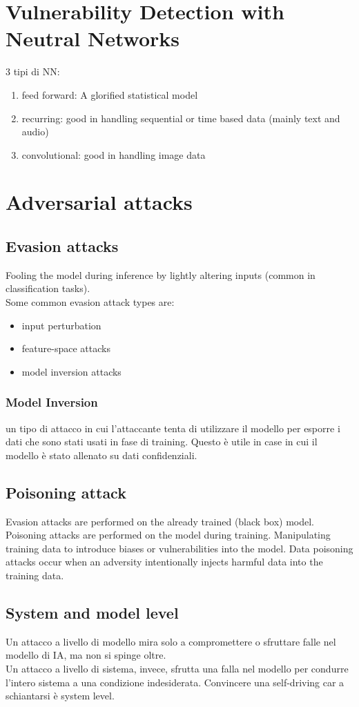 \documentclass{article}
\begin{document}
\section{Vulnerability Detection with Neutral Networks}
3 tipi di NN: \begin{enumerate}
    \item feed forward: A glorified statistical model
    \item recurring: good in handling sequential or time based data (mainly text and audio)
    \item convolutional: good in handling image data
\end{enumerate}

\section{Adversarial attacks}
\subsection{Evasion attacks}
Fooling the model during inference by lightly altering inputs (common in classification tasks).\\
Some common evasion attack types are:
\begin{itemize}
    \item input perturbation
    \item feature-space attacks
    \item model inversion attacks
\end{itemize}

\subsubsection{Model Inversion}
un tipo di attacco in cui l'attaccante tenta di utilizzare il modello per esporre i dati che sono stati usati in fase di training. Questo è utile in case in cui il modello è stato allenato su dati confidenziali.

\subsection{Poisoning attack}
Evasion attacks are performed on the already trained (black box) model. Poisoning attacks are performed on the model during training. Manipulating training data to introduce biases or vulnerabilities into the model. Data poisoning attacks occur when an adversity intentionally injects harmful data into the training data.

\subsection{System and model level}
Un attacco a livello di modello mira solo a compromettere o sfruttare falle nel modello di IA, ma non si spinge oltre. \\
Un attacco a livello di sistema, invece, sfrutta una falla nel modello per condurre l'intero sistema a una condizione indesiderata. Convincere una self-driving car a schiantarsi è system level.
\end{document}
